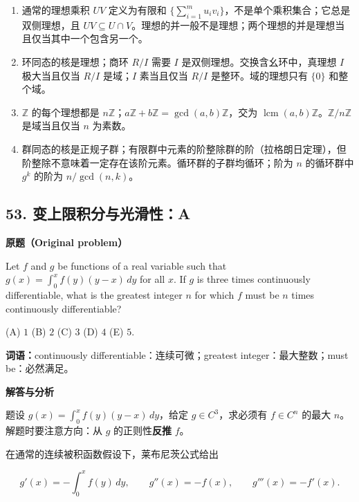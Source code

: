 \documentclass[11pt,a4paper,fontset=fandol]{ctexart}
\providecommand{\tightlist}{\setlength{\itemsep}{0pt}\setlength{\parskip}{0pt}}
\begin{document}
\begin{enumerate}
\def\labelenumi{\arabic{enumi}.}
\tightlist
\item
  通常的理想乘积 \(UV\) 定义为有限和
  \(\{\sum_{i=1}^m u_iv_i\}\)，不是单个乘积集合；它总是双侧理想，且
  \(UV\subseteq U\cap V\)。理想的并一般不是理想；两个理想的并是理想当且仅当其中一个包含另一个。
\item
  环同态的核是理想；商环 \(R/I\) 需要 \(I\)
  是双侧理想。交换含幺环中，真理想 \(I\) 极大当且仅当 \(R/I\)
  是域；\(I\) 素当且仅当 \(R/I\) 是整环。域的理想只有 \(\{0\}\)
  和整个域。
\item
  \(\mathbb Z\) 的每个理想都是
  \(n\mathbb Z\)；\(a\mathbb Z+b\mathbb Z=\gcd(a,b)\mathbb Z\)，交为
  \(\operatorname{lcm}(a,b)\mathbb Z\)。\(\mathbb Z/n\mathbb Z\)
  是域当且仅当 \(n\) 为素数。
\item
  群同态的核是正规子群；有限群中元素的阶整除群的阶（拉格朗日定理），但阶整除不意味着一定存在该阶元素。循环群的子群均循环；阶为
  \(n\) 的循环群中 \(g^k\) 的阶为 \(n/\gcd(n,k)\)。
\end{enumerate}

\hypertarget{ux53d8ux4e0aux9650ux79efux5206ux4e0eux5149ux6ed1ux6027a}{%
\subsection{53.
变上限积分与光滑性：A}\label{ux53d8ux4e0aux9650ux79efux5206ux4e0eux5149ux6ed1ux6027a}}

\textbf{原题（Original problem）}\par
Let $f$ and $g$ be functions of a real variable such that $g(x)=\int_0^x f(y)(y-x)\,dy$ for all $x$. If $g$ is three times continuously differentiable, what is the greatest integer $n$ for which $f$ must be $n$ times continuously differentiable?

(A) $1$ \quad (B) $2$ \quad (C) $3$ \quad (D) $4$ \quad (E) $5$.

\textbf{词语：}continuously differentiable：连续可微；greatest integer：最大整数；must be：必然满足。

\textbf{解答与分析}\par


题设 \(g(x)=\int_0^x f(y)(y-x)\,dy\)，给定 \(g\in C^3\)，求必须有
\(f\in C^n\) 的最大 \(n\)。解题时要注意方向：从 \(g\)
的正则性\textbf{反推} \(f\)。

在通常的连续被积函数假设下，莱布尼茨公式给出

\[g'(x)=-\int_0^x f(y)\,dy,\qquad g''(x)=-f(x),\qquad g'''(x)=-f'(x).\]
\end{document}
